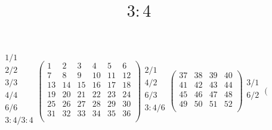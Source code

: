 \documentclass[12pt,a4paper]{amsart}
\title{$3:4$}
\begin{document}
\maketitle


\begin{align*}
\begin{array}{r}
1/1\\%
2/2\\%
3/3\\%
4/4\\%
6/6\\%
3:4/3:4\\%
\end{array}
\left(\begin{array}{rrrrrr}%
1&2&3&4&5&6\\%
7&8&9&10&11&12\\%
13&14&15&16&17&18\\%
19&20&21&22&23&24\\%
25&26&27&28&29&30\\%
31&32&33&34&35&36\\%
\end{array}\right)%
\begin{array}{r}
2/1\\%
4/2\\%
6/3\\%
3:4/6\\%
\end{array}
\left(\begin{array}{rrrr}%
37&38&39&40\\%
41&42&43&44\\%
45&46&47&48\\%
49&50&51&52\\%
\end{array}\right)%
\begin{array}{r}
3/1\\%
6/2\\%
\end{array}
\left(\begin{array}{rr}%

\end{array}
\end{align*}
\end{document}
